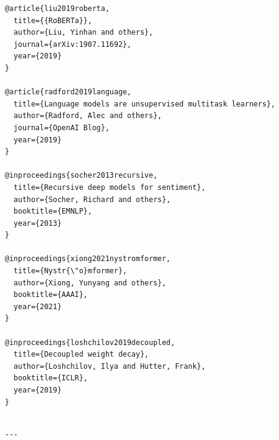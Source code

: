 \begin{lstlisting}
@article{liu2019roberta,
  title={{RoBERTa}},
  author={Liu, Yinhan and others},
  journal={arXiv:1907.11692},
  year={2019}
}

@article{radford2019language,
  title={Language models are unsupervised multitask learners},
  author={Radford, Alec and others},
  journal={OpenAI Blog},
  year={2019}
}

@inproceedings{socher2013recursive,
  title={Recursive deep models for sentiment},
  author={Socher, Richard and others},
  booktitle={EMNLP},
  year={2013}
}

@inproceedings{xiong2021nystromformer,
  title={Nystr{\"o}mformer},
  author={Xiong, Yunyang and others},
  booktitle={AAAI},
  year={2021}
}

@inproceedings{loshchilov2019decoupled,
  title={Decoupled weight decay},
  author={Loshchilov, Ilya and Hutter, Frank},
  booktitle={ICLR},
  year={2019}
}
\end{lstlisting}
\begin{lstlisting}

---
\end{lstlisting}
